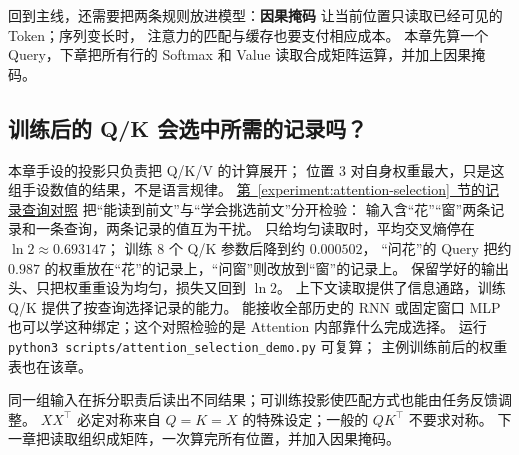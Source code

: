 回到主线，还需要把两条规则放进模型：\textbf{因果掩码}
让当前位置只读取已经可见的 Token；序列变长时，
注意力的匹配与缓存也要支付相应成本。
本章先算一个 Query，下章把所有行的 Softmax 和 Value 读取合成矩阵运算，并加上因果掩码。

\subsection{训练后的 Q/K 会选中所需的记录吗？}

本章手设的投影只负责把 Q/K/V 的计算展开；
位置 3 对自身权重最大，只是这组手设数值的结果，不是语言规律。
\hyperref[experiment:attention-selection]{第~\ref*{experiment:attention-selection}~节的记录查询对照}
把“能读到前文”与“学会挑选前文”分开检验：
输入含“花”“窗”两条记录和一条查询，两条记录的值互为干扰。
只给均匀读取时，平均交叉熵停在 $\ln2\approx0.693147$；
训练 $8$ 个 Q/K 参数后降到约 $0.000502$，
“问花”的 Query 把约 $0.987$ 的权重放在“花”的记录上，“问窗”则改放到“窗”的记录上。
保留学好的输出头、只把权重重设为均匀，损失又回到 $\ln2$。
上下文读取提供了信息通路，训练 Q/K 提供了按查询选择记录的能力。
能接收全部历史的 RNN 或固定窗口 MLP 也可以学这种绑定；这个对照检验的是 Attention 内部靠什么完成选择。
运行 \texttt{python3 scripts/attention\_selection\_demo.py} 可复算；
主例训练前后的权重表也在该章。



\par\smallskip
同一组输入在拆分职责后读出不同结果；可训练投影使匹配方式也能由任务反馈调整。
$XX^\top$ 必定对称来自 $Q=K=X$ 的特殊设定；一般的 $QK^\top$ 不要求对称。
下一章把读取组织成矩阵，一次算完所有位置，并加入因果掩码。
